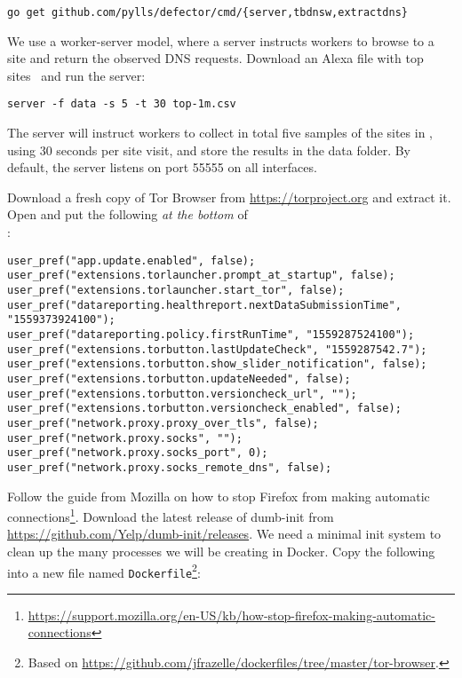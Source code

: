 \documentclass{article}
\begin{document}
\begin{lstlisting}
go get github.com/pylls/defector/cmd/{server,tbdnsw,extractdns}
\end{lstlisting}

We use a worker-server model, where a server instructs workers to browse to a
site and return the observed DNS requests. Download an Alexa file with top
sites~\cite{alexatop1k} and run the server:

\begin{lstlisting}
server -f data -s 5 -t 30 top-1m.csv
\end{lstlisting}
The server will instruct workers to collect in total
five samples of the sites in , using 30 seconds per site visit,
and store the results in the data folder. By default, the server listens on
port 55555 on all interfaces.

Download a fresh copy of Tor Browser from \url{https://torproject.org} and extract it.
Open 
and put the
following \emph{at the bottom} of\\ :

\begin{lstlisting}
user_pref("app.update.enabled", false);
user_pref("extensions.torlauncher.prompt_at_startup", false);
user_pref("extensions.torlauncher.start_tor", false);
user_pref("datareporting.healthreport.nextDataSubmissionTime", "1559373924100");
user_pref("datareporting.policy.firstRunTime", "1559287524100");
user_pref("extensions.torbutton.lastUpdateCheck", "1559287542.7");
user_pref("extensions.torbutton.show_slider_notification", false);
user_pref("extensions.torbutton.updateNeeded", false);
user_pref("extensions.torbutton.versioncheck_url", "");
user_pref("extensions.torbutton.versioncheck_enabled", false);
user_pref("network.proxy.proxy_over_tls", false);
user_pref("network.proxy.socks", "");
user_pref("network.proxy.socks_port", 0);
user_pref("network.proxy.socks_remote_dns", false);
\end{lstlisting}

Follow the guide from Mozilla on how to stop Firefox from making automatic
connections\footnote{\url{https://support.mozilla.org/en-US/kb/how-stop-firefox-making-automatic-connections}}.
Download the latest release of dumb-init from
\url{https://github.com/Yelp/dumb-init/releases}. We need a minimal init system
to clean up the many processes we will be creating in Docker.
Copy the following into a
new file named \texttt{Dockerfile}\footnote{Based on
\url{https://github.com/jfrazelle/dockerfiles/tree/master/tor-browser}.}:
\end{document}
